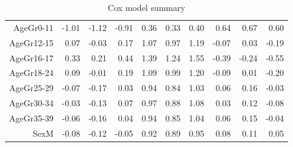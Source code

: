\begin{table}[ht]
\begin{tabular}{rrrrrrrrrr}
  AgeGr0-11 & -1.01 & -1.12 & -0.91 & 0.36 & 0.33 & 0.40 & 0.64 & 0.67 & 0.60 \\ 
  AgeGr12-15 & 0.07 & -0.03 & 0.17 & 1.07 & 0.97 & 1.19 & -0.07 & 0.03 & -0.19 \\ 
  AgeGr16-17 & 0.33 & 0.21 & 0.44 & 1.39 & 1.24 & 1.55 & -0.39 & -0.24 & -0.55 \\ 
  AgeGr18-24 & 0.09 & -0.01 & 0.19 & 1.09 & 0.99 & 1.20 & -0.09 & 0.01 & -0.20 \\ 
  AgeGr25-29 & -0.07 & -0.17 & 0.03 & 0.94 & 0.84 & 1.03 & 0.06 & 0.16 & -0.03 \\ 
  AgeGr30-34 & -0.03 & -0.13 & 0.07 & 0.97 & 0.88 & 1.08 & 0.03 & 0.12 & -0.08 \\ 
  AgeGr35-39 & -0.06 & -0.16 & 0.04 & 0.94 & 0.85 & 1.04 & 0.06 & 0.15 & -0.04 \\ 
  SexM & -0.08 & -0.12 & -0.05 & 0.92 & 0.89 & 0.95 & 0.08 & 0.11 & 0.05 \\ 
   \hline
\end{tabular}
\caption{Cox model summary} 
\end{table}
